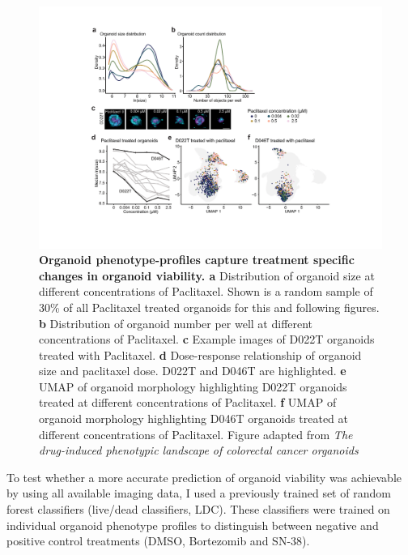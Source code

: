 \begin{flushleft}
\begin{figure}[H]
\centering
\includegraphics[width=\textwidth,
                height=\textheight,
                keepaspectratio]{figures/promise/pdf/fig_2_2.pdf}
\caption[Organoid phenotype-profiles capture treatment specific changes in organoid viability]{\textbf{Organoid phenotype-profiles capture treatment specific changes in organoid viability. a} Distribution of organoid size at different concentrations of Paclitaxel. Shown is a random sample of 30\% of all Paclitaxel treated organoids for this and following figures. \textbf{b} Distribution of organoid number per well at different concentrations of Paclitaxel. \textbf{c} Example images of D022T organoids treated with Paclitaxel. \textbf{d} Dose-response relationship of organoid size and paclitaxel dose. D022T and D046T are highlighted. \textbf{e} UMAP of organoid morphology highlighting D022T organoids treated at different concentrations of Paclitaxel. \textbf{f} UMAP of organoid morphology highlighting D046T organoids treated at different concentrations of Paclitaxel. Figure adapted from \textit{The drug-induced phenotypic landscape of colorectal cancer organoids} \citep{Betge2022-kr}}
\label{fig_222}
\end{figure}
\bigbreak

To test whether a more accurate prediction of organoid viability was achievable by using all available imaging data, I used a previously trained set of random forest classifiers (live/dead classifiers, LDC). These classifiers were trained on individual organoid phenotype profiles to distinguish between negative and positive control treatments (DMSO, Bortezomib and SN-38). 


\end{flushleft}
